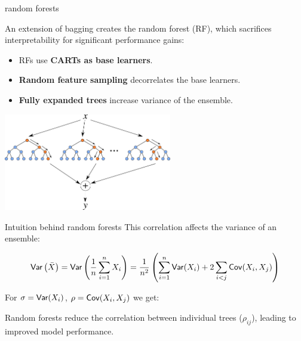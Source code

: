 \documentclass[11pt,compress,t,notes=noshow, xcolor=table]{beamer}
\begin{document}
\begin{vbframe}{random forests }

An extension of bagging creates the random forest (RF), which sacrifices interpretability for significant performance gains:

\begin{itemize}
\item RFs use \textbf{CARTs as base learners}. %
\item \textbf{Random feature sampling} decorrelates the base learners.
\item \textbf{Fully expanded trees} increase variance of the ensemble.
\end{itemize}

\begin{center}
\includegraphics[width=0.55\textwidth]{figure_man/forest.png}
\end{center}

\end{vbframe}


\begin{vbframe}{Intuition behind random forests}
This correlation affects the variance of an ensemble:

$$
\mathsf{Var}\left(\bar{X}\right) = \mathsf{Var}\left(\frac{1}{n} \sum_{i=1}^{n} X_i \right) = \frac{1}{n^2} \left( \sum_{i=1}^{n} \mathsf{Var}(X_i) + 2 \sum_{i < j} \mathsf{Cov}(X_i, X_j) \right)
$$

For $\sigma = \mathsf{Var}(X_i)$, $\rho = \mathsf{Cov}(X_i, X_j)$ we get:


Random forests reduce the correlation between individual trees (\(\rho_{ij}\)), leading to improved model performance.
\end{vbframe}
\end{document}
